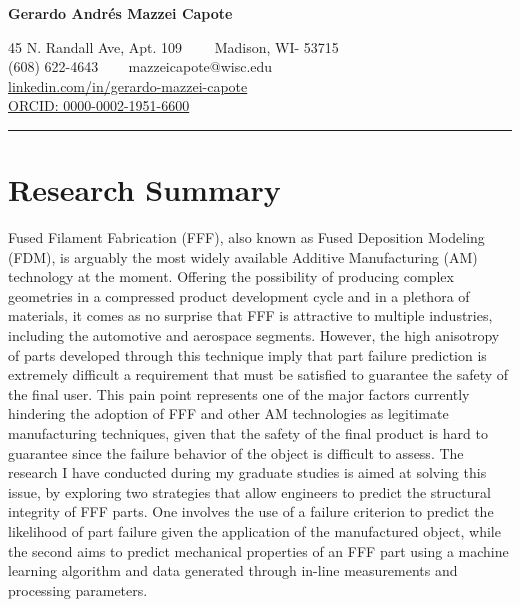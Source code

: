 \documentclass[11pt,letterpaper]{article}
\begin{document}
	
	
	\begin{center}
		{\LARGE \textbf{Gerardo Andrés Mazzei Capote}}
		
		45 N. Randall Ave, Apt. 109\ \ \textbullet
		\ \ Madison, WI- 53715
		\\
		(608) 622-4643 \ \textbullet
		\ \ mazzeicapote@wisc.edu\\
		\href{https://www.linkedin.com/in/gerardo-mazzei-capote}{linkedin.com/in/gerardo-mazzei-capote}\\
		\href{https://orcid.org/0000-0002-1951-6600}{ORCID: 0000-0002-1951-6600}
		
	\end{center}
	\vspace{-0.5em}
	\hrule
	\vspace{0.4em}
	\vspace{-1em}
	
	\section*{Research Summary}
	
	Fused Filament Fabrication (FFF), also known as Fused Deposition Modeling (FDM), is arguably the most widely available Additive Manufacturing (AM) technology at the moment. Offering the possibility of producing complex geometries in a compressed product development cycle and in a plethora of materials, it comes as no surprise that FFF is attractive to multiple industries, including the automotive and aerospace segments. However, the high anisotropy of parts developed through this technique imply that part failure prediction is extremely difficult \textemdash a requirement that must be satisfied to guarantee the safety of the final user. This pain point represents one of the major factors currently hindering the adoption of FFF and other AM technologies as legitimate manufacturing techniques, given that the safety of the final product is hard to guarantee since the failure behavior of the object is difficult to assess. The research I have conducted during my graduate studies is aimed at solving this issue, by exploring two strategies that allow engineers to predict the structural integrity of FFF parts. One involves the use of a failure criterion to predict the likelihood of part failure given the application of the manufactured object, while the second aims to predict mechanical properties of an FFF part using a machine learning algorithm and data generated through in-line measurements and processing parameters. 
	
\end{document}
